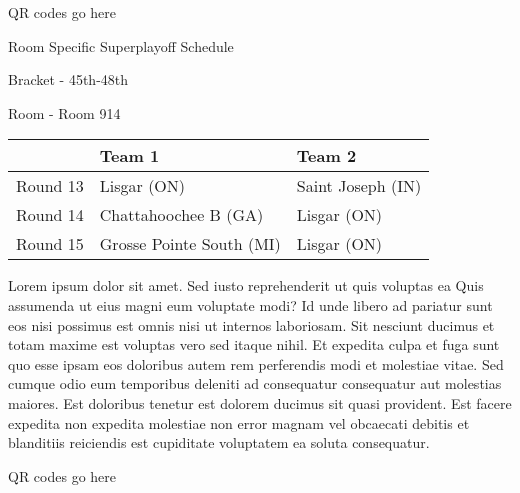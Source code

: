 \documentclass{article}%
\begin{document}
\vspace*{140pt}%
\begin{center}%
\begin{Huge}%
QR codes go here%
\end{Huge}%
\end{center}%
\newpage%
\begin{center}%
\begin{Huge}%
Room Specific Superplayoff Schedule%
\end{Huge}%
\vspace*{8pt}%
\linebreak%
\begin{Large}%
Bracket {-} 45th{-}48th%
\end{Large}%
\vspace*{8pt}%
\linebreak%
\vspace*{8pt}%
\begin{Large}%
Room {-} Room 914%
\end{Large}%
\end{center}%
%
\begin{tabularx}{\textwidth}{|c|Y|Y|}%
\hline%
&Team 1&Team 2\\%
\hline%
Round 13&Lisgar (ON)&Saint Joseph (IN)\\%
Round 14&Chattahoochee B (GA)&Lisgar (ON)\\%
Round 15&Grosse Pointe South (MI)&Lisgar (ON)\\%
\hline%
\end{tabularx}%
\vspace*{8pt}%
\newline%
Lorem ipsum dolor sit amet. Sed iusto reprehenderit ut quis voluptas ea Quis assumenda ut eius magni eum voluptate modi? Id unde libero ad pariatur sunt eos nisi possimus est omnis nisi ut internos laboriosam. Sit nesciunt ducimus et totam maxime est voluptas vero sed itaque nihil. Et expedita culpa et fuga sunt quo esse ipsam eos doloribus autem rem perferendis modi et molestiae vitae.\newline%
\newline%
Sed cumque odio eum temporibus deleniti ad consequatur consequatur aut molestias maiores. Est doloribus tenetur est dolorem ducimus sit quasi provident. Est facere expedita non expedita molestiae non error magnam vel obcaecati debitis et blanditiis reiciendis est cupiditate voluptatem ea soluta consequatur.%
\vspace*{140pt}%
\begin{center}%
\begin{Huge}%
QR codes go here%
\end{Huge}%
\end{center}%
\end{document}
